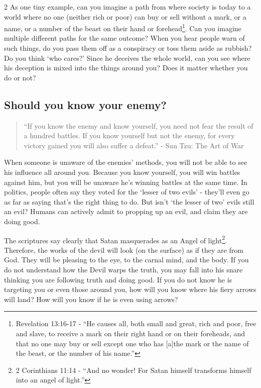 \documentclass[10pt]{article}
\begin{document}
\begin{multicols}{2}
As one tiny example, can you imagine a path from where society is today to a world where no one (neither rich or poor) can buy or sell without a mark, or a name, or a number of the beast on their hand or forehead\footnote{Revelation 13:16-17 - ``He causes all, both small and great, rich and poor, free and slave, to receive a mark on their right hand or on their foreheads, and that no one may buy or sell except one who has [a]the mark or the name of the beast, or the number of his name.''}. Can you imagine multiple different paths for the same outcome? When you hear people warn of such things, do you pass them off as a conspiracy or toss them aside as rubbish? Do you think `who cares?' Since he deceives the whole world, can you see where his deception is mixed into the things around you? Does it matter whether you do or not?







\subsection*{Should you know your enemy?}

\begin{quotation}
``If you know the enemy and know yourself, you need not fear the result of a hundred battles. If you know yourself but not the enemy, for every victory gained you will also suffer a defeat.'' - Sun Tzu: The Art of War
\end{quotation}

When someone is unaware of the enemies' methods, you will not be able to see his influence all around you. Because you know yourself, you will win battles against him, but you will be unaware he's winning battles at the same time. In politics, people often say they voted for the `lesser of two evils' - they'll even go as far as saying that's the right thing to do. But isn't `the lesser of two' evils still an evil? Humans can actively admit to propping up an evil, and claim they are doing good. 

The scriptures say clearly that Satan masquerades as an Angel of light\footnote{2 Corinthians 11:14 - ``And no wonder! For Satan himself transforms himself into an angel of light.''}. Therefore, the works of the devil will look (on the surface) as if they are from God. They will be pleasing to the eye, to the carnal mind, and the body. If you do not understand how the Devil warps the truth, you may fall into his snare thinking you are following truth and doing good. If you do not know he is targeting you or even those around you, how will you know where his fiery arrows will land? How will you know if he is even using arrows?


\end{multicols}
\end{document}
